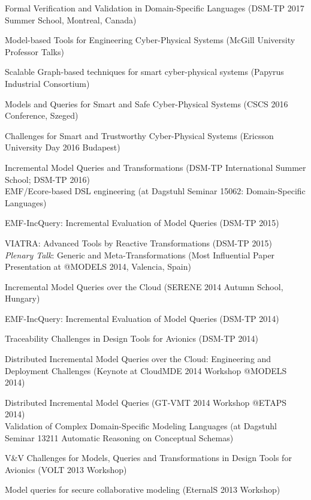 \documentclass{xetexCV}
\begin{document}
Formal Verification and Validation in Domain-Specific Languages (DSM-TP 2017 Summer School, Montreal, Canada)
	
Model-based Tools for Engineering Cyber-Physical Systems (McGill University Professor Talks)

Scalable  Graph-based techniques for smart cyber-physical systems (Papyrus Industrial Consortium)

Models and Queries for Smart and Safe Cyber-Physical Systems (CSCS 2016 Conference, Szeged)

Challenges for Smart and Trustworthy Cyber-Physical Systems (Ericsson University Day 2016 Budapest)

Incremental Model Queries and Transformations (DSM-TP International Summer School; DSM-TP 2016) \\

EMF/Ecore-based DSL engineering  (at Dagstuhl Seminar 15062:  Domain-Specific Languages)

EMF-IncQuery: Incremental Evaluation of Model Queries (DSM-TP 2015) 

VIATRA: Advanced Tools by Reactive Transformations (DSM-TP 2015) \\

\emph{Plenary Talk}: Generic and Meta-Transformations  (Most Influential Paper Presentation at @MODELS 2014, Valencia, Spain)

Incremental Model Queries over the Cloud (SERENE 2014 Autumn School, Hungary)


EMF-IncQuery: Incremental Evaluation of Model Queries (DSM-TP 2014)


Traceability Challenges in Design Tools for Avionics (DSM-TP 2014) 

Distributed Incremental  Model Queries over the Cloud: Engineering and Deployment Challenges 
(Keynote at CloudMDE 2014 Workshop @MODELS 2014)


Distributed Incremental Model Queries (GT-VMT 2014 Workshop @ETAPS 2014) \\


Validation of Complex Domain-Specific Modeling Languages  (at Dagstuhl Seminar 13211 
Automatic Reasoning on Conceptual Schemas)


V\&V Challenges for Models, Queries and Transformations in Design Tools for Avionics (VOLT 2013 Workshop)


Model queries for secure collaborative modeling (EternalS 2013 Workshop) \\
\end{document}
